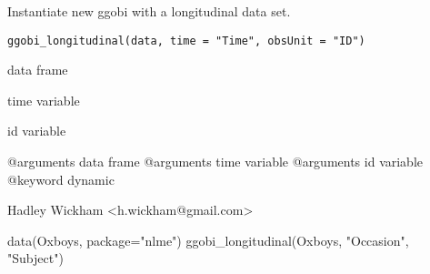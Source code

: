 \begin{Description}\relax
Instantiate new ggobi with a longitudinal data set.
\end{Description}
\begin{Usage}
\begin{verbatim}ggobi_longitudinal(data, time = "Time", obsUnit = "ID")\end{verbatim}
\end{Usage}
\begin{Arguments}
\begin{ldescription}
\item[\code{data}] data frame
\item[\code{time}] time variable
\item[\code{obsUnit}] id variable
\end{ldescription}
\end{Arguments}
\begin{Details}\relax
@arguments data frame
@arguments time variable
@arguments id variable
@keyword dynamic
\end{Details}
\begin{Author}\relax
Hadley Wickham <h.wickham@gmail.com>
\end{Author}
\begin{Examples}
\begin{ExampleCode}data(Oxboys, package="nlme")
ggobi_longitudinal(Oxboys, "Occasion", "Subject")\end{ExampleCode}
\end{Examples}

